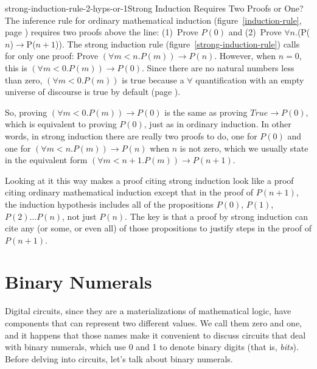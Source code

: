 \begin{aside}{strong-induction-rule-2-hyps-or-1}{Strong Induction Requires Two Proofs or One?}
The inference rule for ordinary mathematical induction
(figure~\ref{induction-rule}, page \pageref{induction-rule})
requires two proofs above the line:
(1)~Prove $P(0)$ and (2)~Prove $\forall$$n$.(P($n$)$\rightarrow$P($n+1$)).
The strong induction rule
(figure~\ref{strong-induction-rule})
calls for only one proof:
Prove $(\forall m<n.P(m))\rightarrow P(n)$.
However, when $n = 0$, this is
$(\forall m<0.P(m))\rightarrow P(0)$.
Since there
are no natural numbers less than zero,
$(\forall m<0.P(m))$ is true because
a $\forall$ quantification with an empty universe of discourse
is true by default
(page \pageref{empty-forall}).

So, proving $(\forall m<0.P(m))\rightarrow P(0)$
is the same as proving $True \rightarrow P(0)$,
which is equivalent to proving $P(0)$,
just as in ordinary induction.
In other words, in strong induction there are really two proofs to do,
one for $P(0)$ and one for $(\forall m<n.P(m))\rightarrow P(n)$
when $n$ is not zero, which we usually state in the
equivalent form $(\forall m<n+1.P(m))\rightarrow P(n+1)$.

Looking at it this way makes a proof citing strong induction look like
a proof citing ordinary mathematical induction except that
in the proof of $P(n+1)$, the
induction hypothesis
includes all of the propositions $P(0)$, $P(1)$, $P(2) \dots P(n)$, not just $P(n)$.
The key is that a proof by strong induction
can cite any (or some, or even all) of those propositions
to justify steps in the proof of
$P(n+1)$.
\end{aside}

\section{Binary Numerals}
\label{sec:binary-numerals}

Digital circuits, since they are a materializations of mathematical logic,
have components that can represent two different values.
We call them zero and one, and it happens that those names
make it convenient to discuss circuits that deal with binary numerals,
which use 0 and 1 to denote binary digits (that is,
\emph{bits}).
Before delving into circuits, let's talk about binary numerals.

